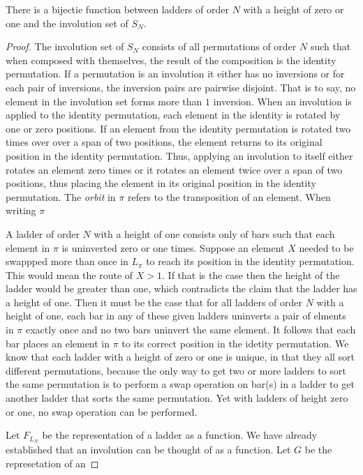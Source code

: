 \begin{theorem}
    There is a bijectie function between ladders of order $N$ with a height of zero or one and the involution set of $S_{N}$.
\end{theorem}
\begin{proof}
    The involution set of $S_{N}$ consists of all permutations of order $N$ such that when composed with themselves, the result of the composition is the identity permutation. 
    If a permutation is an involution it either has no inversions or for each pair of inversions, the inversion pairs are pairwise disjoint. That is to say, no element in the 
    involution set forms more than $1$ inversion. When an involution is applied to the identity permutation, each element in the identity is 
    rotated by one or zero positions. If an element from the identity permutation is rotated two times over over a span of two positions, the element returns to its original position in the identity permutation.
    Thus, applying an involution to itself either rotates an element zero times or it rotates an element twice over a span of two positions, thus placing the element in its 
    original position in the identity permutation. The \emph{orbit} in $\pi$ refers to the transposition of an element. When writing $\pi$  \par 
    A ladder of order $N$ with a height of one consists only of bars such that each element in $\pi$ is uninverted zero or one times. Suppose an element $X$
    needed to be swappped more than once in $L_{\pi}$ to reach its position in the identity permutation. This would mean the route of $X>1$. If that is the case then the height of the ladder would 
    be greater than one, which contradicts the claim that the ladder has a height of one.
    Then it must be the case that for all ladders of order $N$ with a height of one, each bar in any of these given ladders uninverts a pair of elments in $\pi$ exactly once and no two bars 
    uninvert the same element. It follows that each bar places an element in $\pi$ to its correct position 
    in the idetity permutation.  We know that each ladder with a height of zero or one is unique, in that they all sort different permutations, because the only way to get 
    two or more ladders to sort the same permutation is to perform a swap operation on bar(s) in a ladder to get another ladder that sorts the same permutation.
    Yet with ladders of height zero or one, no swap operation can be performed.\par
    Let $F_{L_{N}}$ be the representation of a ladder as a function. We have already established that an involution can be thought of as a function. Let $G$ be the represetation of an 

\end{proof}
